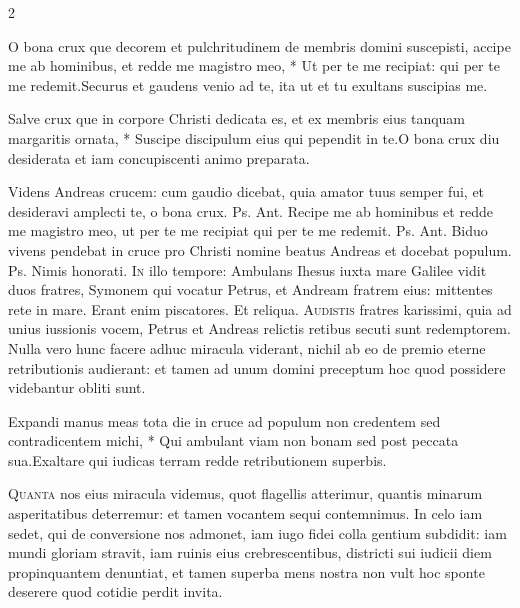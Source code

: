 \begin{multicols*}{2}
\begin{responsory}
\end{responsory}%
\begin{responsory}
{O bona crux que decorem et pulchritudinem de membris domini suscepisti, accipe me ab hominibus, et redde me magistro meo, * Ut per te me recipiat: qui per te me redemit.}{Securus et gaudens venio ad te, ita ut et tu exultans suscipias me.}
\end{responsory}%
\begin{responsory-doxology}
{Salve crux que in corpore Christi dedicata es, et ex membris eius tanquam margaritis ornata, * Suscipe discipulum eius qui pependit in te.}{O bona crux diu desiderata et iam concupiscenti animo preparata.}
\end{responsory-doxology}%
 Videns Andreas crucem: cum gaudio dicebat, quia amator tuus semper fui, et desideravi amplecti te, o bona crux. {\color{Red} Ps.}  {\color{Red} Ant.} Recipe me ab hominibus et redde me magistro meo, ut per te me recipiat qui per te me redemit. {\color{Red} Ps.}  {\color{Red} Ant.} Biduo vivens pendebat in cruce pro Christi nomine beatus Andreas et docebat populum. {\color{Red} Ps.}  \V Nimis honorati.
\lettrine[lines=2]{\zallmancaps \color{Blue} I}{n} illo tempore: Ambulans Ihesus iuxta mare Galilee vidit duos fratres, Symonem qui vocatur Petrus, et Andream fratrem eius: mittentes rete in mare. Erant enim piscatores. Et reliqua.
\lettrine[lines=2]{\zallmancaps \color{Red} A}{udistis} fratres karissimi, quia ad unius iussionis vocem, Petrus et Andreas relictis retibus secuti sunt redemptorem. Nulla vero hunc facere adhuc miracula viderant, nichil ab eo de premio eterne retributionis audierant: et tamen ad unum domini preceptum hoc quod possidere videbantur obliti sunt.
\begin{responsory}
{Expandi manus meas tota die in cruce ad populum non credentem sed contradicentem michi, * Qui ambulant viam non bonam sed post peccata sua.}{Exaltare qui iudicas terram redde retributionem superbis.}
\end{responsory}%
\lettrine[lines=2]{\zallmancaps \color{Blue} Q}{uanta} nos eius miracula videmus, quot flagellis atterimur, quantis minarum asperitatibus deterremur: et tamen vocantem sequi contemnimus. In celo iam sedet, qui de conversione nos admonet, iam iugo fidei colla gentium subdidit: iam mundi gloriam stravit, iam ruinis eius crebrescentibus, districti sui iudicii diem propinquantem denuntiat, et tamen superba mens nostra non vult hoc sponte deserere quod cotidie perdit invita.

\end{multicols*}
